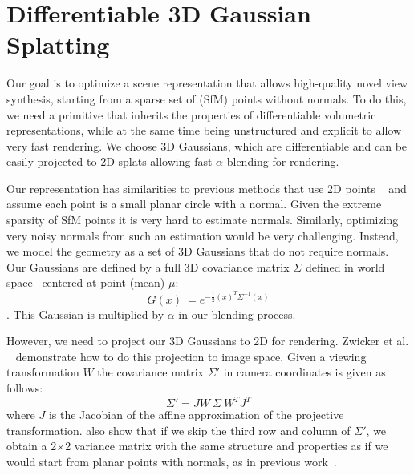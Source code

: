 \section{Differentiable 3D Gaussian Splatting}
\label{sec:3d-splats}


Our goal is to optimize a scene representation that allows high-quality novel view synthesis, starting from a sparse set of (SfM) points without normals. To do this, we need a primitive that inherits the properties of differentiable volumetric representations, while at the same time being unstructured and explicit to allow very fast rendering. We choose 3D Gaussians, which are differentiable
and can be easily projected to 2D splats allowing fast $\alpha$-blending for rendering.

Our representation has similarities to
previous methods that use 2D points ~\cite{yifan19,kopanas21} and assume each point is a small planar circle with a normal. 
Given the extreme sparsity of SfM points it is very hard to estimate normals. Similarly, optimizing very noisy normals from such an estimation would be very challenging.
Instead, we model the geometry as a set of 3D Gaussians that do not require normals. Our Gaussians are defined by a full 3D covariance matrix $\Sigma$ defined in world space~\cite{zwicker2001ewa} centered at point (mean) $\mu$:
\begin{equation}
	G(x)~= e^{-\frac{1}{2}(x)^{T}\Sigma^{-1}(x)}
\end{equation}
. This Gaussian is multiplied by $\alpha$ in our blending process.

However, we need to project our 3D Gaussians to 2D for rendering.
Zwicker et al. ~ demonstrate how to do this projection to image space. Given a viewing transformation $W$
the covariance matrix $\Sigma'$ in camera coordinates is given as follows:
\begin{equation}
	\label{eq:volume-render}
	\Sigma' = J W ~\Sigma ~W ^{T}J^{T}
\end{equation}
where $J$ is the Jacobian of the affine approximation of the projective transformation.  also show that if we skip the third row and column of $\Sigma'$, 
	we obtain a 2$\times$2 variance matrix with the same structure and properties as if we would start from planar points with normals, as in previous work~\cite{kopanas21}.
	
